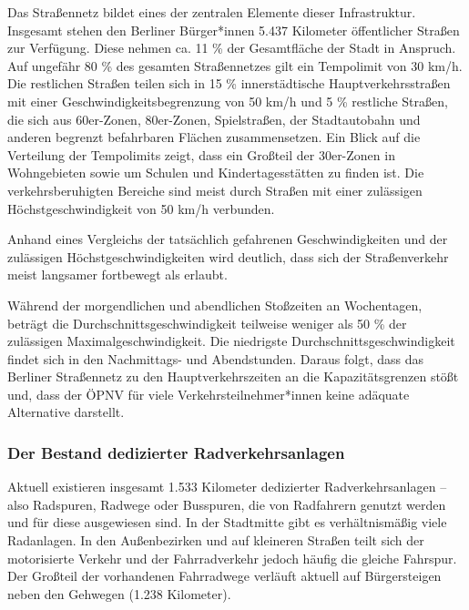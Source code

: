 Das Straßennetz bildet eines der zentralen Elemente dieser Infrastruktur. Insgesamt stehen den Berliner Bürger*innen 5.437 Kilometer öffentlicher Straßen zur Verfügung. Diese nehmen ca. 11 \% der Gesamtfläche der Stadt in Anspruch. Auf ungefähr 80 \% des gesamten Straßennetzes gilt %
ein Tempolimit von 30 km/h. Die restlichen Straßen teilen sich in 15 \% innerstädtische Hauptverkehrsstraßen mit einer Geschwindigkeitsbegrenzung von 50 km/h und 5 \% restliche Straßen, die sich aus 60er-Zonen, 80er-Zonen, Spielstraßen, der Stadtautobahn und anderen begrenzt befahrbaren Flächen zusammensetzen. Ein Blick auf die Verteilung der Tempolimits zeigt, dass ein Großteil der 30er-Zonen in Wohngebieten sowie um Schulen und Kindertagesstätten zu finden ist. Die verkehrsberuhigten Bereiche sind meist durch Straßen mit einer zulässigen Höchstgeschwindigkeit von 50 km/h verbunden.


Anhand eines Vergleichs der tatsächlich gefahrenen Geschwindigkeiten und der zulässigen Höchstgeschwindigkeiten wird deutlich, dass sich der Straßenverkehr meist langsamer fortbewegt als erlaubt.


Während der morgendlichen und abendlichen Stoßzeiten an Wochentagen, beträgt die Durchschnittsgeschwindigkeit teilweise weniger als 50 \% der zulässigen Maximalgeschwindigkeit. Die niedrigste Durchschnittsgeschwindigkeit findet sich in den Nachmittags- und Abendstunden. Daraus folgt, dass das Berliner Straßennetz zu den Hauptverkehrszeiten an die Kapazitätsgrenzen stößt und, dass der ÖPNV für viele Verkehrsteilnehmer*innen keine adäquate Alternative darstellt.

\subsubsection{Der Bestand dedizierter Radverkehrsanlagen}

Aktuell existieren insgesamt 1.533 Kilometer dedizierter Radverkehrsanlagen – also Radspuren, Radwege oder Busspuren, die von Radfahrern genutzt werden und für diese ausgewiesen sind. In der Stadtmitte gibt es verhältnismäßig viele Radanlagen.%
In den Außenbezirken und auf kleineren Straßen teilt sich der motorisierte Verkehr und der Fahrradverkehr jedoch häufig die gleiche Fahrspur. Der Großteil der vorhandenen Fahrradwege verläuft aktuell auf Bürgersteigen neben den Gehwegen (1.238 Kilometer). 

